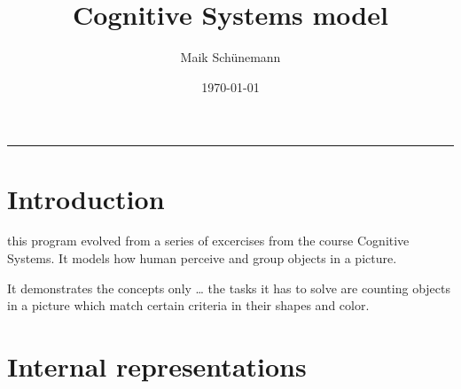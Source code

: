 \documentclass[11pt,a4paper,oneside]{scrartcl}
\author{Maik Schünemann}
\date{\today}
\title{Cognitive Systems model}
\begin{document}
\maketitle
\tableofcontents


\rule{\linewidth}{0.5pt}

\section{Introduction}
\label{sec-1}
this program evolved from a series of excercises from the course
Cognitive Systems. It models how human perceive and group objects
in a picture.

It demonstrates the concepts only \ldots{} the tasks it has to solve are
counting objects in a picture which match certain criteria in their
shapes and color.
\section{Internal representations}
\label{sec-2}
\end{document}
